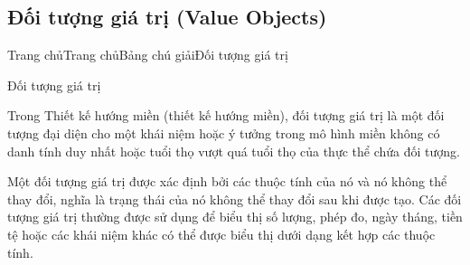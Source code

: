\subsection{Đối tượng giá trị (Value Objects)}
















Trang chủTrang chủBảng chú giảiĐối tượng giá trị

Đối tượng giá trị

Trong Thiết kế hướng miền (thiết kế hướng miền), đối tượng giá trị là một đối tượng đại diện cho một khái niệm hoặc ý tưởng trong mô hình miền không có danh tính duy nhất hoặc tuổi thọ vượt quá tuổi thọ của thực thể chứa đối tượng.

Một đối tượng giá trị được xác định bởi các thuộc tính của nó và nó không thể thay đổi, nghĩa là trạng thái của nó không thể thay đổi sau khi được tạo. Các đối tượng giá trị thường được sử dụng để biểu thị số lượng, phép đo, ngày tháng, tiền tệ hoặc các khái niệm khác có thể được biểu thị dưới dạng kết hợp các thuộc tính.

